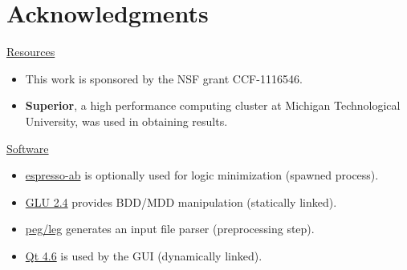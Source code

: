 
\section{Acknowledgments}

\underline{Resources}
\begin{itemize}
\item This work is sponsored by the NSF grant CCF-1116546.
\item \textbf{Superior}, a high performance computing cluster at Michigan Technological University, was used in obtaining results.
\end{itemize}
\underline{Software}
\begin{itemize}
\item \href{http://code.google.com/p/eqntott/downloads/detail?name=espresso-ab-1.0.tar.gz}{espresso-ab} is optionally used for logic minimization (spawned process).
\item \href{http://vlsi.colorado.edu/~vis/Readme/README.glu}{GLU 2.4} provides BDD/MDD manipulation (statically linked).
\item \href{http://piumarta.com/software/peg/}{peg/leg} generates an input file parser (preprocessing step).
\item \href{http://qt-project.org/}{Qt 4.6} is used by the GUI (dynamically linked).
\end{itemize}

